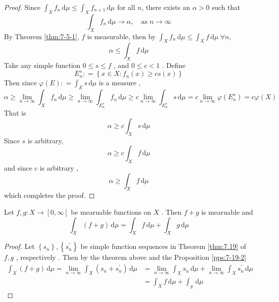\documentclass[../main.tex]{subfiles}
\begin{document}
\begin{proof}
    Since \(  \int_{X} f_{n}\,\mathrm{d} \mu \le \int_{X}f_{n+ 1}\,\mathrm{d} \mu   \) for all \(  n  \), there exists an \(  \alpha > 0  \) such that \[
    \int_{X}f_{n}\,\mathrm{d} \mu \to \alpha ,\quad \text{as } n \to \infty
    \]   By Theorem \ref{thm:7-5-1}, \(  f  \) is measurable,  then by \(  \int_{X}f_{n}\,\mathrm{d} \mu \le \int_{X} f\,\mathrm{d} \mu    \;\forall n\), \[
    \alpha \le \int_{X}f \,\mathrm{d} \mu 
    \]  Take any simple function  \(  0\le s\le f  \) , and \(  0\le c< 1  \) .  Define \[
    E_{n}^{s}: = \left\{ x \in X: f_{n}\left( x \right)\ge cs\left( x \right)   \right\}
    \] Then since \(   \varphi \left( E \right): =  \int_{E}s\,\mathrm{d} \mu    \)   is a measure , \[
    \alpha\ge   \lim_{n\to \infty} \int_{X} f_{n}\,\mathrm{d} \mu \ge  \lim_{n\to \infty} \int_{E_{n}^{s}}f_{n}\,\mathrm{d} \mu \ge  c\lim_{n\to \infty}\int_{E_{n}^{s}}s\,\mathrm{d} \mu = c \lim_{n\to \infty} \varphi \left( E_{n}^{s} \right)=  c  \varphi \left( X \right)  \] That is \[
    \alpha \ge c \int_{X}s \,\mathrm{d} \mu 
    \]Since \(  s  \) is arbitrary, \[
    \alpha \ge c \int_{X} f\,\mathrm{d} \mu 
    \]  and since \(  c  \) is arbitrary , \[
    \alpha \ge  \int_{X} f\,\mathrm{d} \mu 
    \]  which completes the proof. 
\end{proof}


\begin{corollary}{}{}
    Let \(  f,g  :X\to \left[ 0,\infty \right] \) be mearuable functions on \(  X  \) .   Then \(  f+ g  \) is mearuable and   \[
    \int_{X}\left( f+ g \right)\,\mathrm{d} \mu = \int_{X}f\,\mathrm{d} \mu + \int_{X} g\,\mathrm{d} \mu  
    \]
\end{corollary}
\begin{proof}
    Let \(  \left\{ s_{n} \right\} ,\left\{ s_{n}^{\prime}  \right\}  \) be  simple function sequences  in Theorem \ref{thm:7.19} of \(  f ,g  \) , respectively .   Then by the theorem above and the Proposition \ref{pps:7-19-2}  \[
   \begin{aligned}
    \int_{X}\left( f+ g \right)\,\mathrm{d} \mu  = \lim_{n\to \infty}  \int_{X}\left( s_{n}+ s_{n}^{\prime}  \right)\,\mathrm{d} \mu &= \lim_{n\to \infty} \int_{X} s_{n}\,\mathrm{d} \mu + \lim_{n\to \infty} \int_{X}s_{n}^{\prime} \,\mathrm{d} \mu\\ 
     &= \int_{X}f\,\mathrm{d} \mu + \int_{g}\,\mathrm{d} \mu   
   \end{aligned}
    \]
\end{proof}
 
\end{document}
